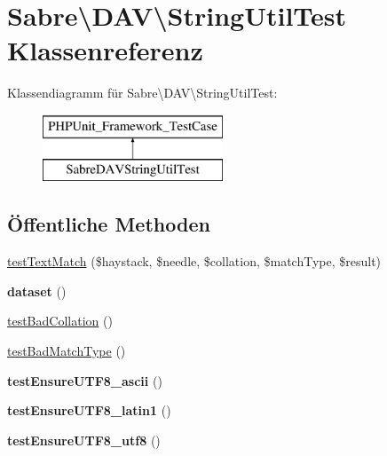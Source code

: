 \hypertarget{class_sabre_1_1_d_a_v_1_1_string_util_test}{}\section{Sabre\textbackslash{}D\+AV\textbackslash{}String\+Util\+Test Klassenreferenz}
\label{class_sabre_1_1_d_a_v_1_1_string_util_test}
Klassendiagramm für Sabre\textbackslash{}D\+AV\textbackslash{}String\+Util\+Test\+:\begin{figure}[H]
\begin{center}
\leavevmode
\includegraphics[height=2.000000cm]{class_sabre_1_1_d_a_v_1_1_string_util_test}
\end{center}
\end{figure}
\subsection*{Öffentliche Methoden}
\begin{DoxyCompactItemize}
\item 
\mbox{\hyperlink{class_sabre_1_1_d_a_v_1_1_string_util_test_a8353913c7e2eb1fcf2dce139d3bae653}{test\+Text\+Match}} (\$haystack, \$needle, \$collation, \$match\+Type, \$result)
\item 
\mbox{\label{class_sabre_1_1_d_a_v_1_1_string_util_test_a6e324dc3bc5ab6429633b8f4aa16af41}} 
{\bfseries dataset} ()
\item 
\mbox{\hyperlink{class_sabre_1_1_d_a_v_1_1_string_util_test_ae0ee3e4ea1c846501bd132217b8d8538}{test\+Bad\+Collation}} ()
\item 
\mbox{\hyperlink{class_sabre_1_1_d_a_v_1_1_string_util_test_aa2264a37f45bc250fbc03470681a7837}{test\+Bad\+Match\+Type}} ()
\item 
\mbox{\label{class_sabre_1_1_d_a_v_1_1_string_util_test_a95b029ee2aeb00f4d576641bea3bfb50}} 
{\bfseries test\+Ensure\+U\+T\+F8\+\_\+ascii} ()
\item 
\mbox{\label{class_sabre_1_1_d_a_v_1_1_string_util_test_a4282e5bf54d4fe195f668e0d6187380f}} 
{\bfseries test\+Ensure\+U\+T\+F8\+\_\+latin1} ()
\item 
\mbox{\label{class_sabre_1_1_d_a_v_1_1_string_util_test_a0e561c82ade01e84e91de715e9394143}} 
{\bfseries test\+Ensure\+U\+T\+F8\+\_\+utf8} ()
\end{DoxyCompactItemize}


